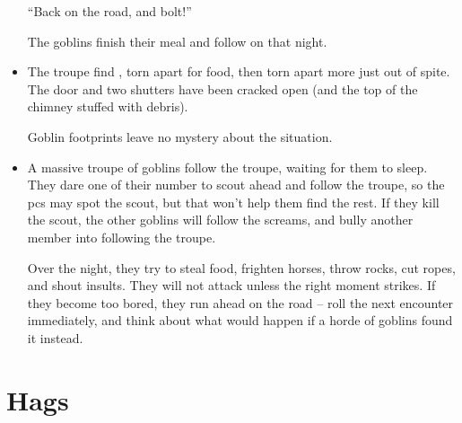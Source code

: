 \begin{multicols}{2}
\begin{itemize}
  ``Back on the road, and bolt!''

  The goblins finish their meal and follow on that night.
  \item
  The troupe find , torn apart for food, then torn apart more just out of spite.
  The door and two shutters have been cracked open (and the top of the chimney stuffed with debris).

  Goblin footprints leave no mystery about the situation.
  \item
  A massive troupe of goblins follow the troupe, waiting for them to sleep.
  They dare one of their number to scout ahead and follow the troupe, so the \glspl{pc} may spot the scout, but that won't help them find the rest.
  If they kill the scout, the other goblins will follow the screams, and bully another member into following the troupe.

  Over the night, they try to steal food, frighten horses, throw rocks, cut ropes, and shout insults.
  They will not attack unless the right moment strikes.
  If they become too bored, they run ahead on the road -- roll the next encounter immediately, and think about what would happen if a horde of goblins found it instead.
\end{itemize}

\end{multicols}

\section[Hag]{Hags}
\label{hag}

